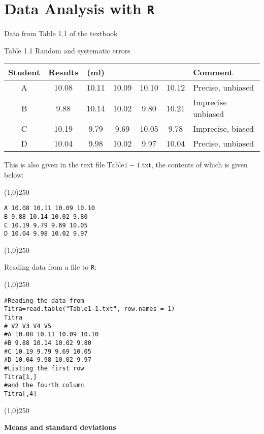 
\section{Data Analysis with \texttt{R}}

Data from Table 1.1 of the textbook

Table 1.1 Random and systematic errors

\begin{tabular}{|c|ccccc|l|}
	\hline
	Student & Results  & (ml) &  &  &  &Comment \\ \hline
	A & 10.08 & 10.11 &10.09 &10.10&10.12 & Precise, unbiased\\ \hline
	B & 9.88 &10.14& 10.02 &9.80& 10.21& Imprecise unbiased\\ \hline
	C & 10.19 &9.79& 9.69 &10.05& 9.78 & Imprecise, biased\\ \hline
	D & 10.04 &9.98 &10.02 &9.97 &10.04 & Precise, unbiased \\
	\hline
\end{tabular}
\bigskip

This is also given in the text file Table$1-1$.txt, the contents of which is given below:
\begin{center}
	\line(1,0){250}
\end{center}
\begin{verbatim}
A 10.08 10.11 10.09 10.10
B 9.88 10.14 10.02 9.80
C 10.19 9.79 9.69 10.05
D 10.04 9.98 10.02 9.97
\end{verbatim}
\begin{center}
	\line(1,0){250}
\end{center}

Reading data from a file to \texttt{R}:
\begin{center}
	\line(1,0){250}
\end{center}
\begin{verbatim}
#Reading the data from
Titra=read.table("Table1-1.txt", row.names = 1)
Titra
# V2 V3 V4 V5
#A 10.08 10.11 10.09 10.10
#B 9.88 10.14 10.02 9.80
#C 10.19 9.79 9.69 10.05
#D 10.04 9.98 10.02 9.97
#Listing the first row
Titra[1,]
#and the fourth column
Titra[,4]
\end{verbatim}
\begin{center}
	\line(1,0){250}
\end{center}

\textbf{Means and standard deviations}\\


